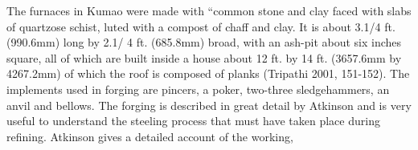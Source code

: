 
{\footnotesize{The furnaces in Kumao were made with ``common stone and clay faced with slabs of quartzose schist, luted with a compost of chaff and clay. It is about 3.1/4 ft. (990.6mm) long by 2.1/ 4 ft. (685.8mm) broad, with an ash-pit about six inches square, all of which are built inside a house about 12 ft. by 14 ft. (3657.6mm by 4267.2mm) of which the roof is composed of planks (Tripathi 2001, 151-152). The implements used in forging are pincers, a poker, two-three sledgehammers, an anvil and bellows. The forging is described in great detail by Atkinson and is very useful to understand the steeling process that must have taken place during refining. Atkinson gives a detailed account of the working}},



